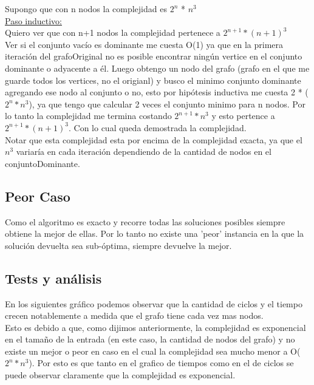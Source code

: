 Supongo que con n nodos la complejidad es $2^n$ * $n^3$\\

\underline{Paso inductivo:}\\

Quiero ver que con n+1 nodos la complejidad pertenece a $2^{n+1}*(n+1)^3$\\

Ver si el conjunto vacío es dominante me cuesta O(1) ya que en la primera iteración del grafoOriginal no es posible encontrar ningún vertice en el conjunto dominante o adyacente a él. Luego obtengo un nodo del grafo (grafo en el que me guarde todos los vertices, no el origianl) y busco el minimo conjunto dominante agregando ese nodo al conjunto o no, esto por hipótesis inductiva me cuesta 2 * ($2^n * n^3$), ya que tengo que calcular 2 veces el conjunto minimo para n nodos. Por lo tanto la complejidad me termina costando  $2^{n+1}*n^3$ y esto pertence a $2^{n+1}*(n+1)^3$. Con lo cual queda demostrada la complejidad.\\

Notar que esta complejidad esta por encima de la complejidad exacta, ya que el $n^3$ variaría en cada iteración dependiendo de la cantidad de nodos en el conjuntoDominante.

\subsection{Peor Caso}

Como el algoritmo es exacto y recorre todas las soluciones posibles siempre obtiene la mejor de ellas. Por lo tanto no existe una 'peor' instancia
en la que la solución devuelta sea sub-óptima, siempre devuelve la mejor.

\subsection{Tests y análisis}
En los siguientes gráfico podemos observar que la cantidad de ciclos y el tiempo crecen notablemente a medida que el grafo tiene cada vez mas nodos.\\
Esto es debido a que, como dijimos anteriormente, la complejidad es exponencial en el tamaño de la entrada (en este caso, la cantidad de nodos 
del grafo) y no existe un mejor o peor en caso en el cual la complejidad sea mucho menor a O($2^n*n^3$). Por esto es que tanto en el grafico de tiempos
 como en el de ciclos se puede observar claramente que la complejidad es exponencial.

